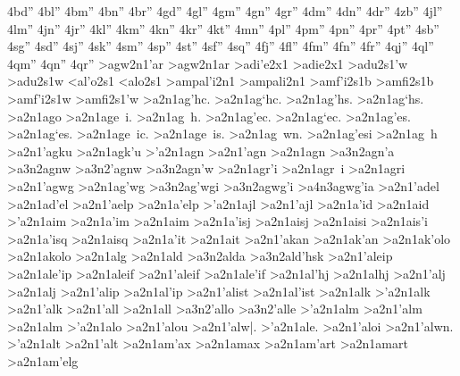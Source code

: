 {4bd''
4bl''
4bm''
4bn''
4br''
%
4gd''
4gl''
4gm''
4gn''
4gr''
%
4dm''
4dn''
4dr''
%
4zb''
%
4jl''
4lm''
4jn''
4jr''
%
4kl''
4km''
4kn''
4kr''
4kt''
%
4mn''
%
4pl''
4pm''
4pn''
4pr''
4pt''
%
4sb''
4sg''
4sd''
4sj''
4sk''
4sm''
4sp''
4st''
4sf''
4sq''
%
4fj''
4fl''
4fm''
4fn''
4fr''
%
4qj''
4ql''
4qm''
4qn''
4qr''
%
>agw2n1'ar  %
>agw2n1ar
>adi'e2x1 		%
>adie2x1
>adu2s1'w 		%
>adu2s1w
<al'o2s1    		%
<alo2s1
>ampal'i2n1 		%
>ampali2n1
>amf'i2s1b 		%
>amfi2s1b
>amf'i2s1w 		%
>amfi2s1'w
>a2n1ag'hc. 		%
>a2n1ag`hc.
>a2n1ag'hs.
>a2n1ag`hs.
>a2n1ago
>a2n1age~i.
>a2n1ag~h.
>a2n1ag'ec.
>a2n1ag`ec.
>a2n1ag'es.
>a2n1ag`es.
>a2n1age~ic.
>a2n1age~is.
>a2n1ag~wn.
>a2n1ag'esi
>a2n1ag~h 
>a2n1'agku 		%
>a2n1agk'u
>'a2n1agn  		%
>a2n1'agn 
>a2n1agn   		%
	>a3n2agn'a 		%
	>a3n2agnw  		%
	>a3n2'agnw 		%
	>a3n2agn'w 
>a2n1agr'i 		%
>a2n1agr~i 		%
>a2n1agri   		%
>a2n1'agwg 		%
>a2n1ag'wg
	>a3n2ag'wgi   		%
	>a3n2agwg'i
		>a4n3agwg'ia 		%
>a2n1'adel 		%
>a2n1ad'el
>a2n1'aelp  		%
>a2n1a'elp
>'a2n1ajl  		%
>a2n1'ajl
>a2n1a'id  		%
>a2n1aid   		%
>'a2n1aim  		%
>a2n1a'im
>a2n1aim   		%
>a2n1a'isj 		%
>a2n1aisj
>a2n1aisi  		%
>a2n1ais'i
>a2n1a'isq  		%
>a2n1aisq
>a2n1a'it 		%
>a2n1ait
>a2n1'akan 		%
>a2n1ak'an
>a2n1ak'olo 		%
>a2n1akolo
>a2n1alg  		%
>a2n1ald  		%
	>a3n2alda 		%
	>a3n2ald'hsk 		%
>a2n1'aleip		%
>a2n1ale'ip
>a2n1aleif 		%
>a2n1'aleif 		%
>a2n1ale'if
>a2n1al'hj 		%
>a2n1alhj
>a2n1'alj 		%
>a2n1alj
>a2n1'alip 		%
>a2n1al'ip
>a2n1'alist 		%
>a2n1al'ist
>a2n1alk  		%
>'a2n1alk 		%
>a2n1'alk
>a2n1'all     		%
>a2n1all
	>a3n2'allo 		%
	>a3n2'alle
>'a2n1alm 		%
>a2n1'alm 		%
>a2n1alm
>'a2n1alo 		%
>a2n1'alou
>a2n1'alw|.
>'a2n1ale.
>a2n1'aloi
>a2n1'alwn.
>'a2n1alt 		%
>a2n1'alt
>a2n1am'ax 		%
>a2n1amax
>a2n1am'art 		%
>a2n1amart
>a2n1am'elg 		%
}
